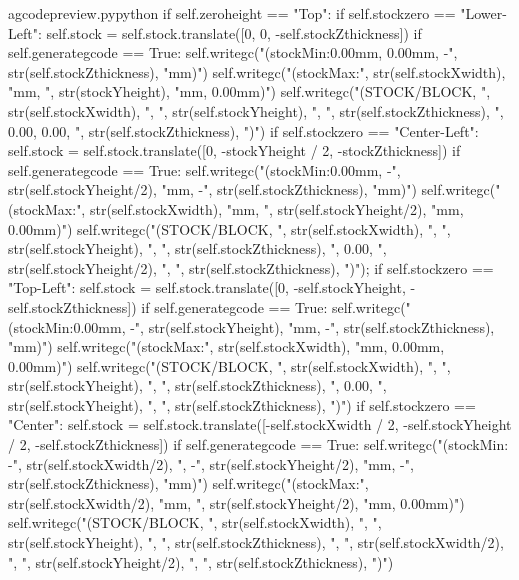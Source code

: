 \documentclass{ltxdoc}
\begin{document}
\lstset{firstnumber=\thegcpy}
\begin{writecode}{a}{gcodepreview.py}{python}
        if self.zeroheight == "Top":
            if self.stockzero == "Lower-Left":
                self.stock = self.stock.translate([0, 0, -self.stockZthickness])
                if self.generategcode == True:
                    self.writegc("(stockMin:0.00mm, 0.00mm, -", str(self.stockZthickness), "mm)")
                    self.writegc("(stockMax:", str(self.stockXwidth), "mm, ", str(stockYheight), "mm, 0.00mm)")
                    self.writegc("(STOCK/BLOCK, ", str(self.stockXwidth), ", ", str(self.stockYheight), ", ", str(self.stockZthickness), ", 0.00, 0.00, ", str(self.stockZthickness), ")")
            if self.stockzero == "Center-Left":
                self.stock = self.stock.translate([0, -stockYheight / 2, -stockZthickness])
                if self.generategcode == True:
                    self.writegc("(stockMin:0.00mm, -", str(self.stockYheight/2), "mm, -", str(self.stockZthickness), "mm)")
                    self.writegc("(stockMax:", str(self.stockXwidth), "mm, ", str(self.stockYheight/2), "mm, 0.00mm)")
                    self.writegc("(STOCK/BLOCK, ", str(self.stockXwidth), ", ", str(self.stockYheight), ", ", str(self.stockZthickness), ", 0.00, ", str(self.stockYheight/2), ", ", str(self.stockZthickness), ")");
            if self.stockzero == "Top-Left":
                self.stock = self.stock.translate([0, -self.stockYheight, -self.stockZthickness])
                if self.generategcode == True:
                    self.writegc("(stockMin:0.00mm, -", str(self.stockYheight), "mm, -", str(self.stockZthickness), "mm)")
                    self.writegc("(stockMax:", str(self.stockXwidth), "mm, 0.00mm, 0.00mm)")
                    self.writegc("(STOCK/BLOCK, ", str(self.stockXwidth), ", ", str(self.stockYheight), ", ", str(self.stockZthickness), ", 0.00, ", str(self.stockYheight), ", ", str(self.stockZthickness), ")")
            if self.stockzero == "Center":
                self.stock = self.stock.translate([-self.stockXwidth / 2, -self.stockYheight / 2, -self.stockZthickness])
                if self.generategcode == True:
                    self.writegc("(stockMin: -", str(self.stockXwidth/2), ", -", str(self.stockYheight/2), "mm, -", str(self.stockZthickness), "mm)")
                    self.writegc("(stockMax:", str(self.stockXwidth/2), "mm, ", str(self.stockYheight/2), "mm, 0.00mm)")
                    self.writegc("(STOCK/BLOCK, ", str(self.stockXwidth), ", ", str(self.stockYheight), ", ", str(self.stockZthickness), ", ", str(self.stockXwidth/2), ", ", str(self.stockYheight/2), ", ", str(self.stockZthickness), ")")

\end{writecode}
\end{document}
